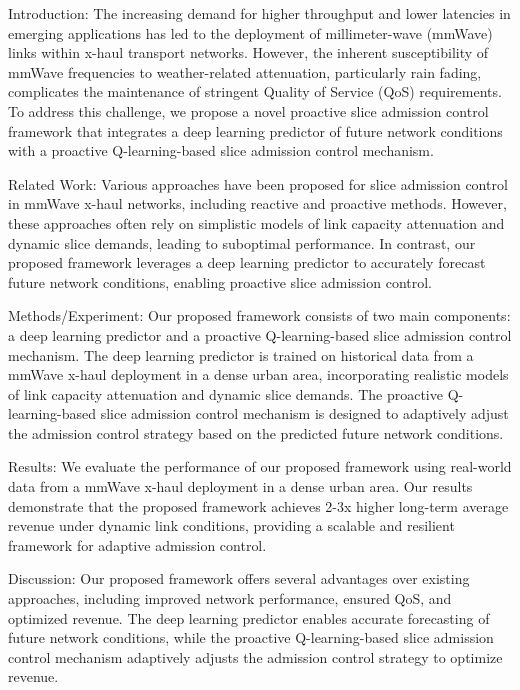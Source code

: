         Introduction: The increasing demand for higher throughput and lower latencies in emerging applications has led to the deployment of millimeter-wave (mmWave) links within x-haul transport networks. However, the inherent susceptibility of mmWave frequencies to weather-related attenuation, particularly rain fading, complicates the maintenance of stringent Quality of Service (QoS) requirements. To address this challenge, we propose a novel proactive slice admission control framework that integrates a deep learning predictor of future network conditions with a proactive Q-learning-based slice admission control mechanism.

        Related Work: Various approaches have been proposed for slice admission control in mmWave x-haul networks, including reactive and proactive methods. However, these approaches often rely on simplistic models of link capacity attenuation and dynamic slice demands, leading to suboptimal performance. In contrast, our proposed framework leverages a deep learning predictor to accurately forecast future network conditions, enabling proactive slice admission control.

        Methods/Experiment: Our proposed framework consists of two main components: a deep learning predictor and a proactive Q-learning-based slice admission control mechanism. The deep learning predictor is trained on historical data from a mmWave x-haul deployment in a dense urban area, incorporating realistic models of link capacity attenuation and dynamic slice demands. The proactive Q-learning-based slice admission control mechanism is designed to adaptively adjust the admission control strategy based on the predicted future network conditions.

        Results: We evaluate the performance of our proposed framework using real-world data from a mmWave x-haul deployment in a dense urban area. Our results demonstrate that the proposed framework achieves 2-3x higher long-term average revenue under dynamic link conditions, providing a scalable and resilient framework for adaptive admission control.

        Discussion: Our proposed framework offers several advantages over existing approaches, including improved network performance, ensured QoS, and optimized revenue. The deep learning predictor enables accurate forecasting of future network conditions, while the proactive Q-learning-based slice admission control mechanism adaptively adjusts the admission control strategy to optimize revenue.

